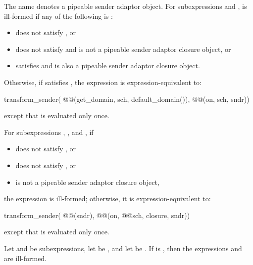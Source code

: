 \pnum
The name  denotes a pipeable sender adaptor object.
For subexpressions  and ,
 is ill-formed if any of the following is :
\begin{itemize}
\item
{} does not satisfy , or
\item
{} does not satisfy  and
 is not
a pipeable sender adaptor closure object, or
\item
{} satisfies  and
is also a pipeable sender adaptor closure object.
\end{itemize}

\pnum
Otherwise, if  satisfies ,
the expression  is expression-equivalent to:
\begin{codeblock}
transform_sender(
  @@(get_domain, sch, default_domain()),
  @@(on, sch, sndr))
\end{codeblock}
except that  is evaluated only once.

\pnum
For subexpressions , , and , if
\begin{itemize}
\item
{} does not satisfy , or
\item
{} does not satisfy , or
\item
{} is not a pipeable sender adaptor closure object,
\end{itemize}
the expression  is ill-formed;
otherwise, it is expression-equivalent to:
\begin{codeblock}
transform_sender(
  @@(sndr),
  @@(on, @@{sch, closure}, sndr))
\end{codeblock}
except that  is evaluated only once.

\pnum
Let  and  be subexpressions,
let  be , and
let  be .
If  is ,
then the expressions  and
 are ill-formed.

